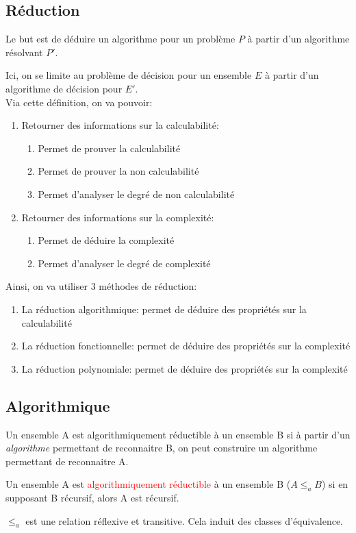 \documentclass{report}
\begin{document}
\subsection{Réduction}
Le but est de déduire un algorithme pour un problème $P$ à partir d'un algorithme résolvant $P'$.\par
Ici, on se limite au problème de décision pour un ensemble $E$ à partir d'un algorithme de décision pour $E'$.\\
Via cette définition, on va pouvoir:
\begin{enumerate}
\item Retourner des informations sur la calculabilité:
	\begin{enumerate}
	\item Permet de prouver la calculabilité
	\item Permet de prouver la non calculabilité
	\item Permet d'analyser le degré de non calculabilité
	\end{enumerate}
\item Retourner des informations sur la complexité:
	\begin{enumerate}
	\item Permet de déduire la complexité
	\item Permet d'analyser le degré de complexité
	\end{enumerate}
\end{enumerate}
Ainsi, on va utiliser 3 méthodes de réduction:
\begin{enumerate}
\item La réduction algorithmique: permet de déduire des propriétés sur la calculabilité
\item La réduction fonctionnelle:  permet de déduire des propriétés sur la complexité
\item La réduction polynomiale:  permet de déduire des propriétés sur la complexité
\end{enumerate}

\subsection{Algorithmique}
Un ensemble A est algorithmiquement réductible à un ensemble B si à partir d'un \textit{algorithme} permettant de reconnaitre B, on peut construire un algorithme permettant de reconnaitre A.\par
Un ensemble A est \textcolor{red}{algorithmiquement réductible} à un ensemble B ($A \leqslant_a B$) si en supposant B récursif, alors A est récursif.\par
$\leqslant_a$ est une relation réflexive et transitive. Cela induit des classes d'équivalence.
\end{document}
